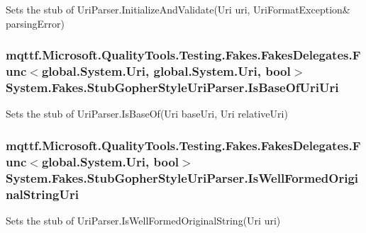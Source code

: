 Sets the stub of Uri\-Parser.\-Initialize\-And\-Validate(Uri uri, Uri\-Format\-Exception\& parsing\-Error)

\hypertarget{class_system_1_1_fakes_1_1_stub_gopher_style_uri_parser_a9cd624f7c59218ef827b38d5b1c0048e}{
\subsubsection[{Is\-Base\-Of\-Uri\-Uri}]{\setlength{\rightskip}{0pt plus 5cm}mqttf.\-Microsoft.\-Quality\-Tools.\-Testing.\-Fakes.\-Fakes\-Delegates.\-Func$<$global.\-System.\-Uri, global.\-System.\-Uri, bool$>$ System.\-Fakes.\-Stub\-Gopher\-Style\-Uri\-Parser.\-Is\-Base\-Of\-Uri\-Uri}}\label{class_system_1_1_fakes_1_1_stub_gopher_style_uri_parser_a9cd624f7c59218ef827b38d5b1c0048e}


Sets the stub of Uri\-Parser.\-Is\-Base\-Of(\-Uri base\-Uri, Uri relative\-Uri)

\hypertarget{class_system_1_1_fakes_1_1_stub_gopher_style_uri_parser_a84ff971157bb7508e95a503001c74ac5}{
\subsubsection[{Is\-Well\-Formed\-Original\-String\-Uri}]{\setlength{\rightskip}{0pt plus 5cm}mqttf.\-Microsoft.\-Quality\-Tools.\-Testing.\-Fakes.\-Fakes\-Delegates.\-Func$<$global.\-System.\-Uri, bool$>$ System.\-Fakes.\-Stub\-Gopher\-Style\-Uri\-Parser.\-Is\-Well\-Formed\-Original\-String\-Uri}}\label{class_system_1_1_fakes_1_1_stub_gopher_style_uri_parser_a84ff971157bb7508e95a503001c74ac5}


Sets the stub of Uri\-Parser.\-Is\-Well\-Formed\-Original\-String(\-Uri uri)

